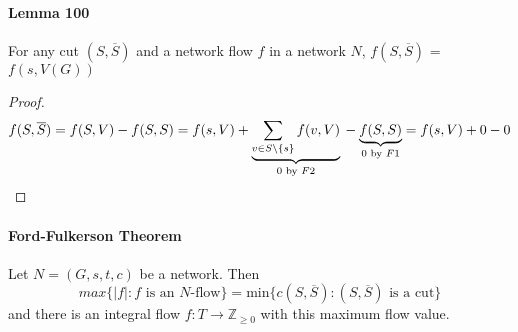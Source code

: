 \paragraph{Lemma 100} For any cut $(S,\overline{S})$
and a network flow $f$ in a network $N$, 
$f(S,\overline{S})$ = $f(s,V(G))$
\begin{proof}
  $$
  f(S,\overline{S}) = f(S,V) - f(S,S) = f(s,V)
  + \underbrace{\sum_{v\in S\setminus\{s\}} f(v,V)}_{0 \text{ by } F2} \\
  - \underbrace{f(S,S)}_{0 \text{ by } F1}
  = f(s,V) + 0 - 0  
  $$
\end{proof}

\paragraph{Ford-Fulkerson Theorem} 
Let $N = (G,s,t,c)$ be a network. Then 
$$ max\{|f|: f \text{ is an } N\text{-flow}\} = 
\text{min}\{c(S,\overline{S}): (S,\overline{S}) \text{ is a cut}\}$$
and there is an integral flow $f: T \to \mathbb{Z}_{\geq0}$
with this maximum flow value.
